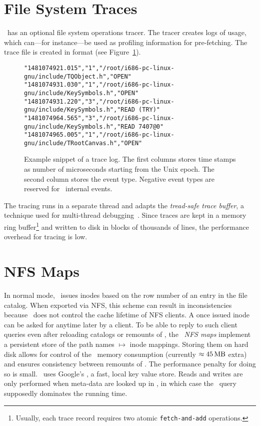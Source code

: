 \section{File System Traces}
\cvmfs\ has an optional file system operations tracer.
The tracer creates logs of usage, which can---for instance---be used as profiling information for pre-fetching.
The trace file is created in  format (see Figure~\ref{fig:traces}).
\begin{figure}
	\centering
	\begin{verbatim}
"1481074921.015","1","/root/i686-pc-linux-gnu/include/TQObject.h","OPEN"
"1481074931.030","1","/root/i686-pc-linux-gnu/include/KeySymbols.h","OPEN"
"1481074931.220","3","/root/i686-pc-linux-gnu/include/KeySymbols.h","READ (TRY)"
"1481074964.565","3","/root/i686-pc-linux-gnu/include/KeySymbols.h","READ 7407@0"
"1481074965.005","1","/root/i686-pc-linux-gnu/include/TRootCanvas.h","OPEN"
	\end{verbatim}
	\caption{Example snippet of a trace log. The first columns stores time stamps as number of microseconds starting from the Unix epoch. The second column stores the event type. Negative event types are reserved for \cvmfs\ internal events.}
	\label{fig:traces}
\end{figure}

The tracing runs in a separate thread and adapts the \emph{tread-safe trace buffer}, a technique used for multi-thread debugging~\cite[Chapter 8]{multicore06}.
Since traces are kept in a memory ring buffer\footnote{Usually, each trace record requires two atomic \texttt{fetch-and-add} operations.} and written to disk in blocks of thousands of lines, the performance overhead for tracing is low.

\section{NFS Maps}
In normal mode, \cvmfs\ issues inodes based on the row number of an entry in the file catalog.
When exported via NFS, this scheme can result in inconsistencies because \cvmfs\ does not control the cache lifetime of NFS clients.
A once issued inode can be asked for anytime later by a client. 
To be able to reply to such client queries even after reloading catalogs or remounts of \cvmfs, the \cvmfs\ \emph{NFS maps} implement a persistent store of the path names $\mapsto$ inode mappings.
Storing them on hard disk allows for control of the \cvmfs\ memory consumption (currently $\approx\SI{45}{\mega\byte}$ extra) and ensures consistency between remounts of \cvmfs. 
The performance penalty for doing so is small. 
\cvmfs\ uses Google's \leveldb\cite{leveldb}, a fast, local key value store. 
Reads and writes are only performed when meta-data are looked up in \sqlite, in which case the \sqlite\ query supposedly dominates the running time.

